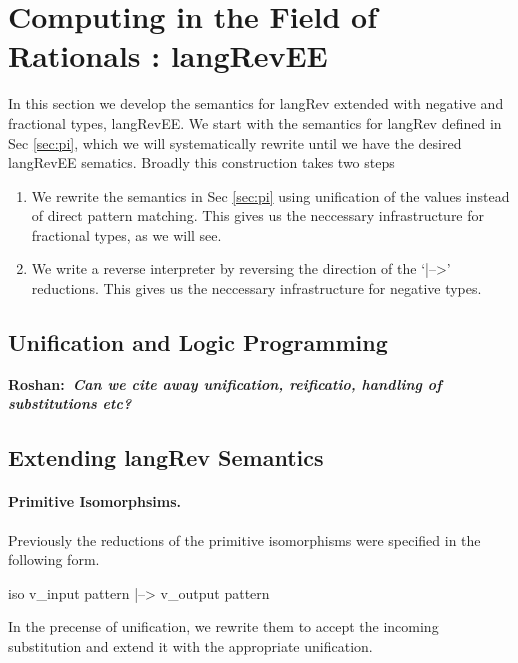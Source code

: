 \documentclass[preprint]{sigplanconf}
\newcommand{\xcomment}[2]{\textbf{#1:~\textsl{#2}}}
\newcommand{\roshan}[1]{\xcomment{Roshan}{#1}}
\begin{document}
\section{Computing in the Field of Rationals : {{langRevEE}} }
\label{sec:rat}


In this section we develop the semantics for {{langRev}} extended with
negative and fractional types, {{langRevEE}}.  We start with the
semantics for {{langRev}} defined in Sec \ref{sec:pi}, which we will
systematically rewrite until we have the desired {{langRevEE}}
sematics. Broadly this construction takes two steps 

\begin{enumerate}
\item We rewrite the semantics in Sec \ref{sec:pi} using unification
  of the values instead of direct pattern matching. This gives us the
  neccessary infrastructure for fractional types, as we will see. 

\item We write a reverse interpreter by reversing the direction of the
  `{{|-->}}' reductions. This gives us the neccessary infrastructure for
  negative types.
\end{enumerate}

\subsection{Unification and Logic Programming}

\roshan{Can we cite away unification, reificatio, handling of
  substitutions etc?}

\subsection{Extending {{langRev}} Semantics}


\paragraph{Primitive Isomorphsims.}
Previously the reductions of the primitive isomorphisms were specified
in the following form.

{{ iso v_{input pattern} |--> v_{output pattern} }}

\noindent
In the precense of unification, we rewrite them to accept the incoming
substitution and extend it with the appropriate unification.
\end{document}

